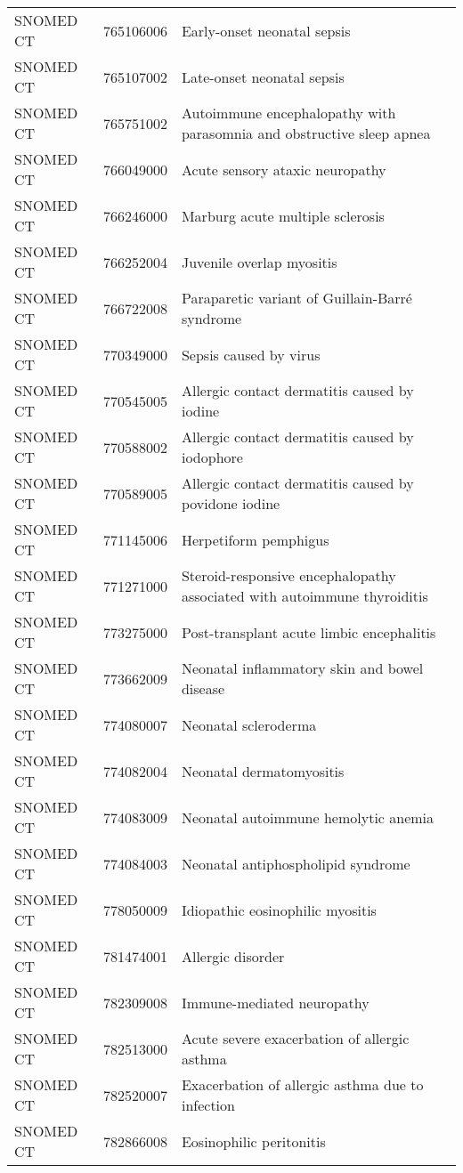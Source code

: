 \begin{longtable}{p{}p{}p{}}
  SNOMED CT & 765106006 & Early-onset neonatal sepsis \\ 
  SNOMED CT & 765107002 & Late-onset neonatal sepsis \\ 
  SNOMED CT & 765751002 & Autoimmune encephalopathy with parasomnia and obstructive sleep apnea \\ 
  SNOMED CT & 766049000 & Acute sensory ataxic neuropathy \\ 
  SNOMED CT & 766246000 & Marburg acute multiple sclerosis \\ 
  SNOMED CT & 766252004 & Juvenile overlap myositis \\ 
  SNOMED CT & 766722008 & Paraparetic variant of Guillain-Barré syndrome \\ 
  SNOMED CT & 770349000 & Sepsis caused by virus \\ 
  SNOMED CT & 770545005 & Allergic contact dermatitis caused by iodine \\ 
  SNOMED CT & 770588002 & Allergic contact dermatitis caused by iodophore \\ 
  SNOMED CT & 770589005 & Allergic contact dermatitis caused by povidone iodine \\ 
  SNOMED CT & 771145006 & Herpetiform pemphigus \\ 
  SNOMED CT & 771271000 & Steroid-responsive encephalopathy associated with autoimmune thyroiditis \\ 
  SNOMED CT & 773275000 & Post-transplant acute limbic encephalitis \\ 
  SNOMED CT & 773662009 & Neonatal inflammatory skin and bowel disease \\ 
  SNOMED CT & 774080007 & Neonatal scleroderma \\ 
  SNOMED CT & 774082004 & Neonatal dermatomyositis \\ 
  SNOMED CT & 774083009 & Neonatal autoimmune hemolytic anemia \\ 
  SNOMED CT & 774084003 & Neonatal antiphospholipid syndrome \\ 
  SNOMED CT & 778050009 & Idiopathic eosinophilic myositis \\ 
  SNOMED CT & 781474001 & Allergic disorder \\ 
  SNOMED CT & 782309008 & Immune-mediated neuropathy \\ 
  SNOMED CT & 782513000 & Acute severe exacerbation of allergic asthma \\ 
  SNOMED CT & 782520007 & Exacerbation of allergic asthma due to infection \\ 
  SNOMED CT & 782866008 & Eosinophilic peritonitis \\ 

\end{longtable}
